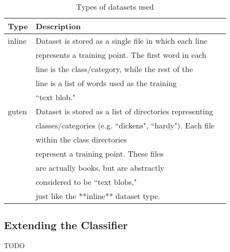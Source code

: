 \begin{table}
    \begin{tabular}{lll}
        \hline
        \textbf{Type} & \textbf{Description} \\ [0.5ex]
        \hline\hline
        inline & Dataset is stored as a single file in which each line \\
               & represents a training point. The first word in each \\
               & line is the class/category, while the rest of the \\
               & line is a list of words used as the training \\
               & ``text blob." \\
        guten  & Dataset is stored as a list of directories representing \\
               & classes/categories (e.g. ``dickens", ``hardy"). Each file \\
               & within the class directories \\
               & represent a training point. These files \\
               & are actually books, but are abstractly \\
               & considered to be ``text blobs," \\
               & just like the **inline** dataset type. \\
        \hline
    \end{tabular}
    \caption{Types of datasets used}
    \label{table:datasetTypes}
\end{table}



\subsection{Extending the Classifier}
\label{subsection:advancedResults}
TODO


